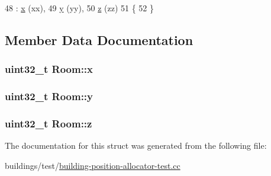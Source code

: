 \begin{DoxyCode}
48   : \hyperlink{structRoom_a0e0fa03d04caae95880bee7e3cb1aadc}{x} (xx),
49     \hyperlink{structRoom_a8e723a0cf8ef39fb01987baaa920371b}{y} (yy),
50     \hyperlink{structRoom_ab16dc742be0bf18a232b085fbe22d967}{z} (zz)
51 \{
52 \}
\end{DoxyCode}


\subsection{Member Data Documentation}
\subsubsection[{\texorpdfstring{x}{x}}]{\setlength{\rightskip}{0pt plus 5cm}uint32\+\_\+t Room\+::x}\hypertarget{structRoom_a0e0fa03d04caae95880bee7e3cb1aadc}{}\label{structRoom_a0e0fa03d04caae95880bee7e3cb1aadc}
\subsubsection[{\texorpdfstring{y}{y}}]{\setlength{\rightskip}{0pt plus 5cm}uint32\+\_\+t Room\+::y}\hypertarget{structRoom_a8e723a0cf8ef39fb01987baaa920371b}{}\label{structRoom_a8e723a0cf8ef39fb01987baaa920371b}
\subsubsection[{\texorpdfstring{z}{z}}]{\setlength{\rightskip}{0pt plus 5cm}uint32\+\_\+t Room\+::z}\hypertarget{structRoom_ab16dc742be0bf18a232b085fbe22d967}{}\label{structRoom_ab16dc742be0bf18a232b085fbe22d967}


The documentation for this struct was generated from the following file\+:\begin{DoxyCompactItemize}
\item 
buildings/test/\hyperlink{building-position-allocator-test_8cc}{building-\/position-\/allocator-\/test.\+cc}\end{DoxyCompactItemize}
